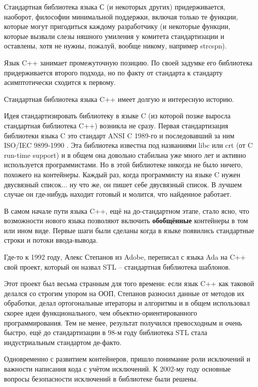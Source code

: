 \documentclass[a4paper,12pt,oneside]{book}
\begin{document}
Стандартная библиотека языка С (и некоторых других) придерживается, наоборот, философии минимальной поддержки, включая только те функции, которые могут пригодиться каждому разработчику (и некоторые функции, которые вызвали слезы няшного умиления у комитета стандартизации и оставлены, хотя не нужны, пожалуй, вообще никому, например strcspn).

Язык C++ занимает промежуточную позицию. По своей задумке его библиотека придерживается второго подхода, но по факту от стандарта к стандарту асимптотически сходится к первому.

Стандартная библиотека языка C++ имеет долгую и интересную историю. 

Идея стандартизировать библиотеку в языке C (из которой позже выросла стандартная библиотека C++) возникла не сразу. Первая стандартизация библиотеки языка C это стандарт ANSI C 1989-го и последовавший за ним ISO/IEC 9899-1990 \cite{stdc90}. Эта библиотека известна под названиями libc или crt (от C run-time support) и в общем она довольно стабильна уже много лет и активно используется программистами. Но в этой библиотеке никогда не было ничего, похожего на контейнеры. Каждый раз, когда программисту на языке C нужен двусвязный список... ну что же, он пишет себе двусвязный список. В лучшем случае он где-нибудь находит готовый и молится, что найденное работает.

В самом начале пути языка C++, ещё на до-стандартном этапе, стало ясно, что возможности нового языка позволяют включить \textbf{обобщённые} контейнеры в том или ином виде. Первые шаги были сделаны когда в языке появились стандартные строки и потоки ввода-вывода.

Где-то к 1992 году, Алекс Степанов из Adobe, переписал с языка Ada на C++ свой проект, который он назвал STL -- стандартная библиотека шаблонов.

Этот проект был весьма странным для того времени: если язык C++ как таковой делался со строгим упором на ООП, Степанов разносил данные от методов их обработки, делал ортогональные итераторы и алгоритмы и в общем использовал скорее идеи функционального, чем объектно-ориентированного программирования. Тем не менее, результат получился превосходным и очень быстро, ещё до стандартизации в 98-м году библиотека STL стала индустриальным стандартом де-факто.

Одновременно с развитием контейнеров, пришло понимание роли исключений и важности написания кода с учётом исключений. К 2002-му году основные вопросы безопасности исключений в библиотеке были решены.
\end{document}

